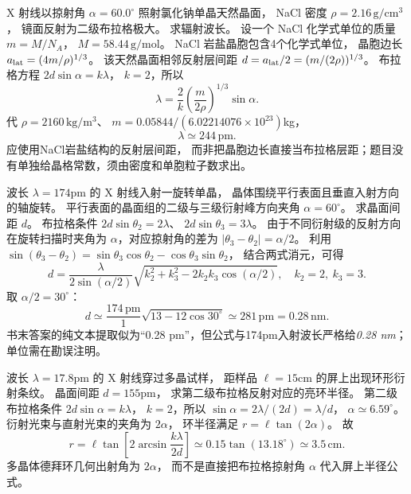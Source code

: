 X 射线以掠射角
$\alpha=60.0^\circ$ 照射氯化钠单晶天然晶面，
NaCl 密度
$\rho=2.16\,\mathrm{g/cm^3}$，
镜面反射为二级布拉格极大。
求辐射波长。
\exsolution
设一个 NaCl 化学式单位的质量
$m=M/N_A$，
$M=58.44\,\mathrm{g/mol}$。
NaCl 岩盐晶胞包含4个化学式单位，
晶胞边长
$a_{\rm lat}=(4m/\rho)^{1/3}$。
该天然晶面相邻反射层间距
$d=a_{\rm lat}/2=(m/(2\rho))^{1/3}$。
布拉格方程
$2d\sin\alpha=k\lambda$，
$k=2$，所以
\[
\boxed{\lambda=\frac{2}{k}
\left(\frac{m}{2\rho}\right)^{1/3}
\sin\alpha}.
\]
代
$\rho=2160\,\mathrm{kg/m^3}$、
$m=0.05844/(6.02214076\times10^{23})$kg，
\[
\boxed{\lambda\simeq244\,\mathrm{pm}}.
\]
\excheck 应使用NaCl岩盐结构的反射层间距，
而非把晶胞边长直接当布拉格层距；题目没有单独给晶格常数，须由密度和单胞粒子数求出。

波长
$\lambda=174$pm 的 X 射线入射一旋转单晶，
晶体围绕平行表面且垂直入射方向的轴旋转。
平行表面的晶面组的二级与三级衍射峰方向夹角
$\alpha=60^\circ$。
求晶面间距 $d$。
\exsolution
布拉格条件
$2d\sin\theta_2=2\lambda$、
$2d\sin\theta_3=3\lambda$。
由于不同衍射级的反射方向在旋转扫描时夹角为
$\alpha$，对应掠射角的差为
$|\theta_3-\theta_2|=\alpha/2$。
利用
$\sin(\theta_3-\theta_2)
=\sin\theta_3\cos\theta_2-\cos\theta_3\sin\theta_2$，
结合两式消元，可得
\[
\boxed{d=
\frac{\lambda}{2\sin(\alpha/2)}
\sqrt{k_2^2+k_3^2-2k_2k_3\cos(\alpha/2)}},
\quad k_2=2,\ k_3=3.
\]
取 $\alpha/2=30^\circ$：
\[
\boxed{d\simeq
\frac{174\,\mathrm{pm}}{1}
\sqrt{13-12\cos30^\circ}
\simeq281\,\mathrm{pm}
=0.28\,\mathrm{nm}}.
\]
\excheck 书末答案的纯文本提取似为“0.28 pm”，但公式与174pm入射波长严格给\emph{0.28 nm}；单位需在勘误注明。

波长
$\lambda=17.8$pm 的 X 射线穿过多晶试样，
距样品 $\ell=15$cm 的屏上出现环形衍射条纹。
晶面间距
$d=155$pm，
求第二级布拉格反射对应的亮环半径。
\exsolution
第二级布拉格条件
$2d\sin\alpha=k\lambda$，
$k=2$，所以
$\sin\alpha=2\lambda/(2d)=\lambda/d$，
$\alpha\simeq6.59^\circ$。
衍射光束与直射光束的夹角为
$2\alpha$，
环半径满足
$r=\ell\tan(2\alpha)$。
故
\[
\boxed{r=\ell
\tan\left[2\arcsin\frac{k\lambda}{2d}\right]
\simeq0.15\tan(13.18^\circ)
\simeq3.5\,\mathrm{cm}}.
\]
\excheck 多晶体德拜环几何出射角为 $2\alpha$，
而不是直接把布拉格掠射角 $\alpha$ 代入屏上半径公式。
